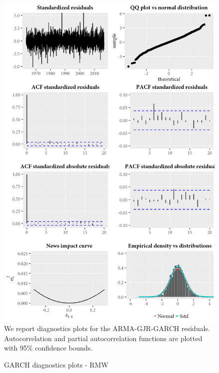 \begin{figure}[H]
  \caption{GARCH diagnostics plots - RMW}
  \label{diag:garchdiagRMW}
  \centering
  \begin{minipage}{\textwidth}
  \includegraphics[scale=1]{graphics/garch/garch_diagnosticsRMW.png}  
  \vspace{3mm}
  \footnotesize
  We report diagnostics plots for the ARMA-GJR-GARCH residuals. Autocorrelation and partial autocorrelation functions are plotted with 95\% confidence bounds.
  \end{minipage}
\end{figure}
